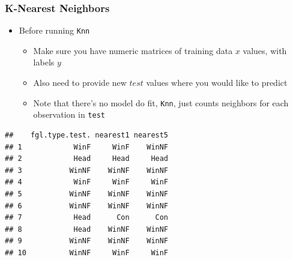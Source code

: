 \documentclass[
  shownotes,
  xcolor={svgnames},
  hyperref={colorlinks,citecolor=DarkBlue,linkcolor=DarkRed,urlcolor=DarkBlue}
  , aspectratio=169]{beamer}
\newenvironment{Shaded}{\begin{snugshade}}{\end{snugshade}}
\newcommand{\DataTypeTok}[1]{\textcolor[rgb]{0.13,0.29,0.53}{#1}}
\newcommand{\DecValTok}[1]{\textcolor[rgb]{0.00,0.00,0.81}{#1}}
\newcommand{\KeywordTok}[1]{\textcolor[rgb]{0.13,0.29,0.53}{\textbf{#1}}}
\newcommand{\NormalTok}[1]{#1}
\newcommand{\OperatorTok}[1]{\textcolor[rgb]{0.81,0.36,0.00}{\textbf{#1}}}
\newcommand{\StringTok}[1]{\textcolor[rgb]{0.31,0.60,0.02}{#1}}
\begin{document}
\begin{frame}[fragile]
\frametitle{K-Nearest Neighbors}

\begin{itemize}
  \item Before running \texttt{Knn}
  \begin{itemize}
    \item Make sure you have numeric matrices of training data $x$ values, with labels $y$
    \item Also need to provide new $test$ values where you would like to predict
    \item Note that there's no model do fit, \texttt{Knn}, just counts neighbors for each observation in \texttt{test}
  \end{itemize}
  
\end{itemize}
\begin{scriptsize}
\begin{Shaded}
\end{Shaded}
\end{scriptsize}
\begin{tiny}

\begin{verbatim}
##    fgl.type.test. nearest1 nearest5
## 1            WinF     WinF    WinNF
## 2            Head     Head     Head
## 3           WinNF    WinNF    WinNF
## 4            WinF     WinF     WinF
## 5           WinNF    WinNF    WinNF
## 6           WinNF    WinNF    WinNF
## 7            Head      Con      Con
## 8            Head    WinNF    WinNF
## 9           WinNF    WinNF    WinNF
## 10          WinNF     WinF     WinF
\end{verbatim}
\end{tiny}
\end{frame}
\end{document}
